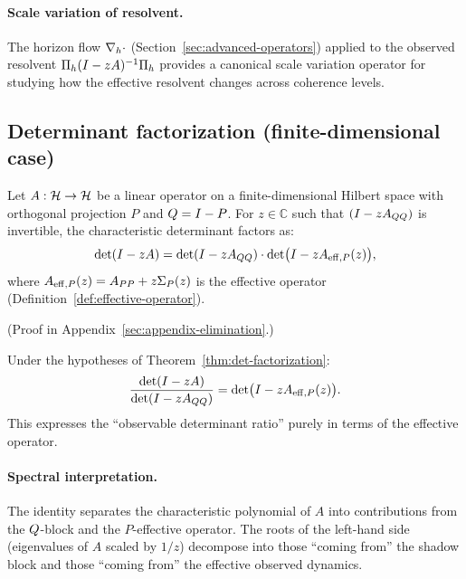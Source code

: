 \paragraph{Scale variation of resolvent.}
The horizon flow $\nabla_{h} \cdot$ (Section~\ref{sec:advanced-operators}) applied to the observed resolvent $\Pi_{h} (I-zA)^{-1} \Pi_{h}$ provides a canonical scale variation operator for studying how the effective resolvent changes across coherence levels.

\subsection{Determinant factorization (finite-dimensional case)}

\begin{theorem}
\label{thm:det-factorization}
Let $A:\mathcal{H} \to \mathcal{H}$ be a linear operator on a finite-dimensional Hilbert space with orthogonal projection $P$ and $Q = I - P$.
For $z \in \mathbb{C}$ such that $(I - zA_{QQ})$ is invertible, the characteristic determinant factors as:
\[
\det(I - zA) = \det(I - zA_{QQ}) \cdot \det\bigl(I - zA_{\mathrm{eff},P}(z)\bigr),
\]
where $A_{\mathrm{eff},P}(z) = A_{PP} + z\Sigma_{P}(z)$ is the effective operator (Definition~\ref{def:effective-operator}).
\end{theorem}

(Proof in Appendix~\ref{sec:appendix-elimination}.)

\begin{corollary}
\label{cor:det-ratio}
Under the hypotheses of Theorem~\ref{thm:det-factorization}:
\[
\frac{\det(I - zA)}{\det(I - zA_{QQ})} = \det\bigl(I - zA_{\mathrm{eff},P}(z)\bigr).
\]
This expresses the ``observable determinant ratio'' purely in terms of the effective operator.
\end{corollary}

\paragraph{Spectral interpretation.}
The identity separates the characteristic polynomial of $A$ into contributions from the $Q$-block and the $P$-effective operator.
The roots of the left-hand side (eigenvalues of $A$ scaled by $1/z$) decompose into those ``coming from'' the shadow block and those ``coming from'' the effective observed dynamics.


